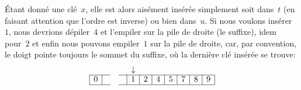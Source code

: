 Étant donné une clé~\(x\), elle est alors aisément insérée simplement
soit dans~\(t\) (en faisant attention que l'ordre est inverse) ou bien
dans~\(u\). Si nous voulons insérer~\(1\), nous devrions dépiler~\(4\)
et l'empiler sur la pile de droite (le suffixe), idem pour~\(2\) et
enfin nous pouvons empiler~\(1\) sur la pile de droite, car, par
convention, le doigt pointe toujours le sommet du suffixe, où la
dernière clé insérée se trouve:
\begin{equation*}
\abovedisplayskip=0pt
\begin{array}{@{}|c|ccc|c|c|c|c|c|c|c|@{}}
  \multicolumn{1}{c}{} & \multicolumn{1}{c}{} & \multicolumn{1}{c}{}
& \multicolumn{1}{c}{} & \multicolumn{1}{c}{\downarrow}\\
\cline{1-2}\cline{4-11}
0 & & & & 1 & 2 & 4 & 5 & 7 & 8 & 9\\
\cline{1-2}\cline{4-11}
\end{array}
\end{equation*}

